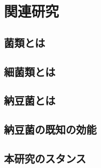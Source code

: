\chapter{関連研究}
\section{菌類とは}
\section{細菌類とは}
\section{納豆菌とは}
\section{納豆菌の既知の効能}
\section{本研究のスタンス}
